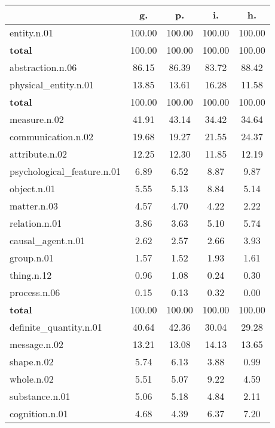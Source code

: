 \begin{table}[h!]
\begin{center}
\begin{tabular}{| l || c | c | c | c |}\hline
 & {\bf g.} & {\bf p.} & {\bf i.} & {\bf h.} \\\hline\hline
entity.n.01 & 100.00  & 100.00  & 100.00  & 100.00 \\\hline\hline
{{\bf total}} & 100.00  & 100.00  & 100.00  & 100.00 \\\hline\hline\hline
abstraction.n.06 & 86.15  & 86.39  & 83.72  & 88.42 \\\hline
physical\_entity.n.01 & 13.85  & 13.61  & 16.28  & 11.58 \\\hline\hline
{{\bf total}} & 100.00  & 100.00  & 100.00  & 100.00 \\\hline\hline\hline
measure.n.02 & 41.91  & 43.14  & 34.42  & 34.64 \\\hline
communication.n.02 & 19.68  & 19.27  & 21.55  & 24.37 \\\hline
attribute.n.02 & 12.25  & 12.30  & 11.85  & 12.19 \\\hline
psychological\_feature.n.01 & 6.89  & 6.52  & 8.87  & 9.87 \\\hline
object.n.01 & 5.55  & 5.13  & 8.84  & 5.14 \\\hline
matter.n.03 & 4.57  & 4.70  & 4.22  & 2.22 \\\hline
relation.n.01 & 3.86  & 3.63  & 5.10  & 5.74 \\\hline
causal\_agent.n.01 & 2.62  & 2.57  & 2.66  & 3.93 \\\hline
group.n.01 & 1.57  & 1.52  & 1.93  & 1.61 \\\hline
thing.n.12 & 0.96  & 1.08  & 0.24  & 0.30 \\\hline
process.n.06 & 0.15  & 0.13  & 0.32  & 0.00 \\\hline\hline
{{\bf total}} & 100.00  & 100.00  & 100.00  & 100.00 \\\hline\hline\hline
definite\_quantity.n.01 & 40.64  & 42.36  & 30.04  & 29.28 \\\hline
message.n.02 & 13.21  & 13.08  & 14.13  & 13.65 \\\hline
shape.n.02 & 5.74  & 6.13  & 3.88  & 0.99 \\\hline
whole.n.02 & 5.51  & 5.07  & 9.22  & 4.59 \\\hline
substance.n.01 & 5.06  & 5.18  & 4.84  & 2.11 \\\hline
cognition.n.01 & 4.68  & 4.39  & 6.37  & 7.20 \\\hline

\end{tabular}
\end{center}
\end{table}
